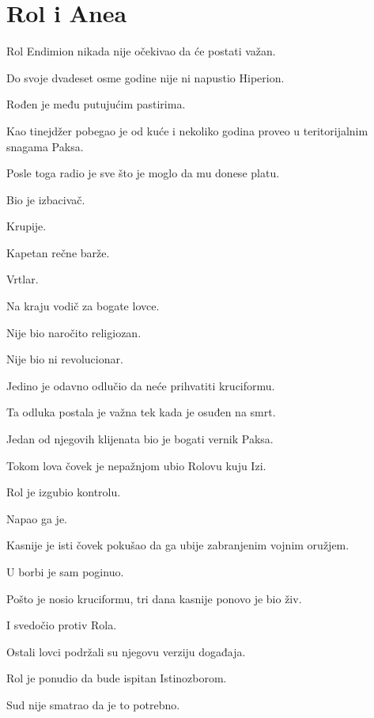 
\chapter{Rol i Anea}


Rol Endimion nikada nije očekivao da će postati važan.

Do svoje dvadeset osme godine nije ni napustio Hiperion.

Rođen je među putujućim pastirima.

Kao tinejdžer pobegao je od kuće i nekoliko godina proveo u teritorijalnim snagama Paksa.

Posle toga radio je sve što je moglo da mu donese platu.

Bio je izbacivač.

Krupije.

Kapetan rečne barže.

Vrtlar.

Na kraju vodič za bogate lovce.

Nije bio naročito religiozan.

Nije bio ni revolucionar.

Jedino je odavno odlučio da neće prihvatiti kruciformu.

\bigskip

Ta odluka postala je važna tek kada je osuđen na smrt.

\bigskip

Jedan od njegovih klijenata bio je bogati vernik Paksa.

Tokom lova čovek je nepažnjom ubio Rolovu kuju Izi.

Rol je izgubio kontrolu.

Napao ga je.

Kasnije je isti čovek pokušao da ga ubije zabranjenim vojnim oružjem.

U borbi je sam poginuo.

\bigskip

Pošto je nosio kruciformu, tri dana kasnije ponovo je bio živ.

I svedočio protiv Rola.

Ostali lovci podržali su njegovu verziju događaja.

Rol je ponudio da bude ispitan Istinozborom.

Sud nije smatrao da je to potrebno.

